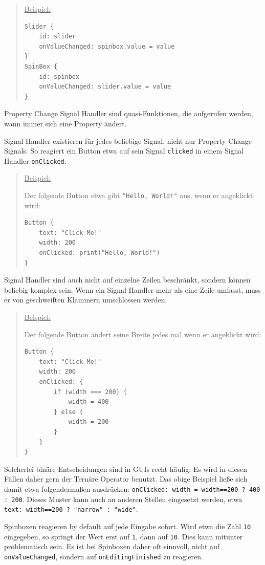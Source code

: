 \documentclass[a4paper]{article}
\begin{document}
\begin{quote}
\uline{Beispiel:}

\begin{verbatim}
Slider {
    id: slider
    onValueChanged: spinbox.value = value
}
SpinBox {
    id: spinbox
    onValueChanged: slider.value = value
}
\end{verbatim}
\end{quote}

Property Change Signal Handler sind quasi-Funktionen, die aufgerufen werden, wann immer sich eine Property ändert.

Signal Handler existieren für jedes beliebige Signal, nicht nur Property Change Signals. So reagiert ein Button etwa auf sein Signal \verb~clicked~ in einem Signal Handler \verb~onClicked~.

\begin{quote}
\uline{Beispiel:}

Der folgende Button etwa gibt \verb~"Hello, World!"~ aus, wenn er angeklickt wird:
\begin{verbatim}
Button {
    text: "Click Me!"
    width: 200
    onClicked: print("Hello, World!")
}
\end{verbatim}
\end{quote}

Signal Handler sind auch nicht auf einzelne Zeilen beschränkt, sondern können beliebig komplex sein. Wenn ein Signal Handler mehr als eine Zeile umfasst, muss er von geschweiften Klammern umschlossen werden.

\begin{quote}
\uline{Beispiel:}

Der folgende Button ändert seine Breite jedes mal wenn er angeklickt wird:

\begin{verbatim}
Button {
    text: "Click Me!"
    width: 200
    onClicked: {
        if (width === 200) {
            width = 400
        } else {
            width = 200
        }
    }
}
\end{verbatim}
\end{quote}

Solcherlei binäre Entscheidungen sind in GUIs recht häufig. Es wird in diesen Fällen daher gern der Ternäre Operator benutzt. Das obige Beispiel ließe sich damit etwa folgendermaßen ausdrücken: \verb~onClicked: width = width==200 ? 400 : 200~. Dieses Muster kann auch an anderen Stellen eingesetzt werden, etwa \verb~text: width==200 ? "narrow" : "wide"~.

Spinboxen reagieren by default auf jede Eingabe sofort. Wird etwa die Zahl \verb~10~ eingegeben, so springt der Wert erst auf \verb~1~, dann auf \verb~10~. Dies kann mitunter problematisch sein. Es ist bei Spinboxen daher oft sinnvoll, nicht auf \verb~onValueChanged~, sondern auf \verb~onEditingFinished~ zu reagieren.
\end{document}
